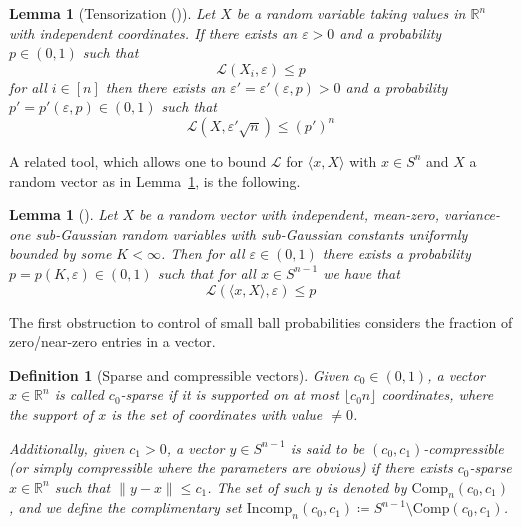 \documentclass[11pt]{article}
\numberwithin{equation}{section}
\newtheorem{lemma}[theorem]{Lemma}
\newtheorem{definition}[theorem]{Definition}
\theoremstyle{remark}
\newcommand{\R}{\mathbb{R}}
\newcommand{\LevyFunc}{\mathcal{L}}
\newcommand{\Comp}{\mathrm{Comp}}
\newcommand{\Incomp}{\mathrm{Incomp}}
\begin{document}
\begin{lemma}[Tensorization ({\cite[Lemma 2.2]{christoffersen2025gaps}})]\label{lem-tensorization}
    Let $X$ be a random variable taking values in $\R^n$ with independent coordinates. If there exists an $\varepsilon > 0$ and a probability $p \in (0, 1)$ such that
    \begin{equation}
        \LevyFunc(X_i, \varepsilon) \leq p
    \end{equation}
    for all $i \in [n]$ then there exists an $\varepsilon' = \varepsilon'(\varepsilon, p) > 0$ and a probability $p' = p'(\varepsilon, p) \in (0, 1)$ such that 
    \begin{equation*}
        \LevyFunc(X, \varepsilon'
        \sqrt{n}) \leq (p')^n
    \end{equation*}
\end{lemma}

A related tool, which allows one to bound $\LevyFunc$ for $\langle x, X \rangle$ with $x \in S^n$ and $X$ a random vector as in Lemma~\ref{lem-tensorization}, is the following.

\begin{lemma}[{\cite[Lemma 2.3]{christoffersen2025gaps}}]\label{lem-sum-concentration}
    Let $X$ be a random vector with independent, mean-zero, variance-one sub-Gaussian random variables with sub-Gaussian constants uniformly bounded by some $K < \infty$. Then for all $\varepsilon \in (0, 1)$ there exists a probability $p = p(K, \varepsilon) \in (0, 1)$ such that for all $x \in S^{n - 1}$ we have that
    \begin{equation*}
        \LevyFunc(\langle x, X \rangle, \varepsilon) \leq p
    \end{equation*}
\end{lemma}

The first obstruction to control of small ball probabilities considers the fraction of zero/near-zero entries in a vector. 

\begin{definition}[Sparse and compressible vectors]\label{def-compression}
    Given $c_0 \in (0, 1)$, a vector $x \in \R^n$ is called $c_0$-sparse if it is supported on at most $\lfloor c_0 n \rfloor$ coordinates, where the support of $x$ is the set of coordinates with value $\neq 0$.

    Additionally, given $c_1 > 0$, a vector $y \in S^{n - 1}$ is said to be $(c_0, c_1)$-compressible (or simply compressible where the parameters are obvious) if there exists $c_0$-sparse $x\in \R^n$ such that $\|y-x\|\leq c_1$. The set of such $y$ is denoted by $\Comp_n(c_0, c_1)$, and we define the complimentary set $\Incomp_n(c_0, c_1) \coloneqq S^{n - 1} \setminus \Comp(c_0, c_1)$.
\end{definition}
\end{document}

